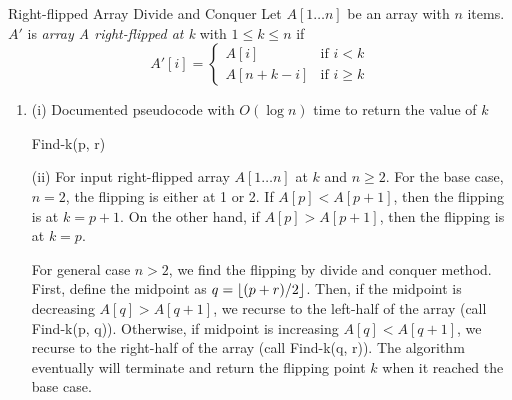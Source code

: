 \documentclass{article}
\begin{document}
\newpage
\begin{section}{Right-flipped Array Divide and Conquer}
Let $A[1 \dots n]$ be an array with $n$ items. $A'$ is {\it array A right-flipped at k} with $1 \leq k \leq n$ if
\begin{equation}
    A'[i] = \begin{cases}
    A[i] & \text{if $i < k$} \\
    A[n + k -i] & \text{if $i \geq k$}
    \end{cases}
\end{equation}
\begin{enumerate}
    \item (i) Documented pseudocode with $O(\log n)$ time to return the value of $k$ \\
        \begin{minipage}{\linewidth}
        \begin{algorithm}[H]
        \caption{Find-k(p, r)}
        \end{algorithm}
        \end{minipage}
       
        (ii) For input right-flipped array $A[1 \dots n]$ at $k$ and $n \geq 2$. For the base case, $n = 2$, the flipping is either at 1 or 2. If $A[p] < A[p + 1]$, then the flipping is at $k = p + 1$. On the other hand, if $A[p] > A[p+1]$, then the flipping is at $k = p$.
        
        For general case $n > 2$, we find the flipping by divide and conquer method. First, define the midpoint as $q = \lfloor(p + r)/2\rfloor$. Then, if the midpoint is decreasing $A[q] > A[q+1]$, we recurse to the left-half of the array (call Find-k(p, q)). Otherwise, if midpoint is increasing $A[q] < A[q+1]$, we recurse to the right-half of the array (call Find-k(q, r)). The algorithm eventually will terminate and return the flipping point $k$ when it reached the base case.
        

\end{enumerate}
\end{section}
\end{document}
